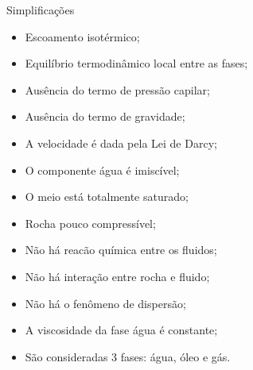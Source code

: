 \documentclass[professionalfont]{beamer}
\begin{document}
\begin{frame}{Simplificações}
    \begin{itemize}
        \item Escoamento isotérmico;
        \item Equilíbrio termodinâmico local entre as fases;
        \item Ausência do termo de pressão capilar;
        \item Ausência do termo de gravidade;
        \item A velocidade é dada pela Lei de Darcy;
        \item O componente água é imiscível;
        \item O meio está totalmente saturado;
        \item Rocha pouco compressível;
        \item Não há reacão química entre os fluidos;
        \item Não há interação entre rocha e fluido;
        \item Não há o fenômeno de dispersão;
        \item A viscosidade da fase água é constante;
        \item São consideradas 3 fases: água, óleo e gás.
    \end{itemize}
    
\end{frame}
\end{document}
